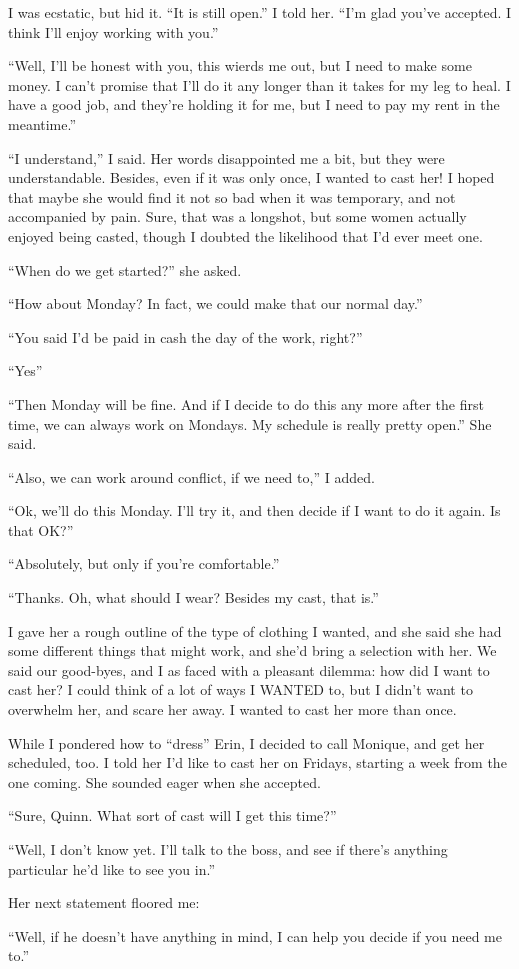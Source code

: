 I was ecstatic, but hid it. ``It is still open.'' I told her. ``I'm glad you've accepted. I
think I'll enjoy working with you.''

``Well, I'll be honest with you, this wierds me out, but I need to make some money. I can't
promise that I'll do it any longer than it takes for my leg to heal. I have a good job, and
they're holding it for me, but I need to pay my rent in the meantime.''

``I understand,'' I said. Her words disappointed me a bit, but they were understandable.
Besides, even if it was only once, I wanted to cast her! I hoped that maybe she would find it
not so bad when it was temporary, and not accompanied by pain. Sure, that was a longshot, but
some women actually enjoyed being casted, though I doubted the likelihood that I'd ever meet
one.

``When do we get started?'' she asked.

``How about Monday? In fact, we could make that our normal day.''

``You said I'd be paid in cash the day of the work, right?''

``Yes''

``Then Monday will be fine. And if I decide to do this any more after the first time, we can
always work on Mondays. My schedule is really pretty open.'' She said.

``Also, we can work around conflict, if we need to,'' I added.

``Ok, we'll do this Monday. I'll try it, and then decide if I want to do it again. Is that
OK?''

``Absolutely, but only if you're comfortable.''

``Thanks. Oh, what should I wear? Besides my cast, that is.''

I gave her a rough outline of the type of clothing I wanted, and she said she had some
different things that might work, and she'd bring a selection with her. We said our good-byes,
and I as faced with a pleasant dilemma: how did I want to cast her? I could think of a lot of
ways I WANTED to, but I didn't want to overwhelm her, and scare her away. I wanted to cast her
more than once.

While I pondered how to ``dress'' Erin, I decided to call Monique, and get her scheduled,
too. I told her I'd like to cast her on Fridays, starting a week from the one coming. She
sounded eager when she accepted.

``Sure, Quinn. What sort of cast will I get this time?''

``Well, I don't know yet. I'll talk to the boss, and see if there's anything particular he'd
like to see you in.''

Her next statement floored me:

``Well, if he doesn't have anything in mind, I can help you decide if you need me to.''
